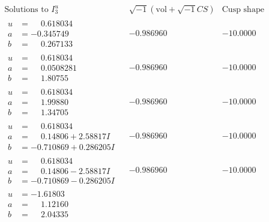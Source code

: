 \documentclass[1p]{elsarticle_modified}
\theoremstyle{definition}
\newcommand{\I}{\sqrt{-1}}
\begin{document}
$$\begin{array}{c|c|c}  
\text{Solutions to }I^u_{3}& \I (\text{vol} + \sqrt{-1}CS) & \text{Cusp shape}\\
 \hline 
\begin{aligned}
u &= \phantom{-}0.618034\phantom{ +0.000000I} \\
a &= -0.345749\phantom{ +0.000000I} \\
b &= \phantom{-}0.267133\phantom{ +0.000000I}\end{aligned}
 & -0.986960\phantom{ +0.000000I} & -10.0000\phantom{ +0.000000I} \\ \hline\begin{aligned}
u &= \phantom{-}0.618034\phantom{ +0.000000I} \\
a &= \phantom{-}0.0508281\phantom{ +0.000000I} \\
b &= \phantom{-}1.80755\phantom{ +0.000000I}\end{aligned}
 & -0.986960\phantom{ +0.000000I} & -10.0000\phantom{ +0.000000I} \\ \hline\begin{aligned}
u &= \phantom{-}0.618034\phantom{ +0.000000I} \\
a &= \phantom{-}1.99880\phantom{ +0.000000I} \\
b &= \phantom{-}1.34705\phantom{ +0.000000I}\end{aligned}
 & -0.986960\phantom{ +0.000000I} & -10.0000\phantom{ +0.000000I} \\ \hline\begin{aligned}
u &= \phantom{-}0.618034\phantom{ +0.000000I} \\
a &= \phantom{-}0.14806 + 2.58817 I \\
b &= -0.710869 + 0.286205 I\end{aligned}
 & -0.986960\phantom{ +0.000000I} & -10.0000\phantom{ +0.000000I} \\ \hline\begin{aligned}
u &= \phantom{-}0.618034\phantom{ +0.000000I} \\
a &= \phantom{-}0.14806 - 2.58817 I \\
b &= -0.710869 - 0.286205 I\end{aligned}
 & -0.986960\phantom{ +0.000000I} & -10.0000\phantom{ +0.000000I} \\ \hline\begin{aligned}
u &= -1.61803\phantom{ +0.000000I} \\
a &= \phantom{-}1.12160\phantom{ +0.000000I} \\
b &= \phantom{-}2.04335\phantom{ +0.000000I}\end{aligned}

\end{array}$$
\end{document}
